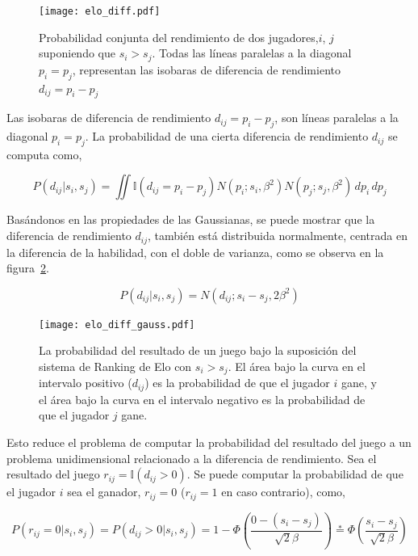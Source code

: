 \documentclass[11pt,twoside, spanish]{report} %
\begin{document}
\begin{figure}[H]
	\centering
	\texttt{[image: elo\_diff.pdf]}
	\caption{Probabilidad conjunta del rendimiento de dos jugadores,$i$, $j$ suponiendo que $s_i>s_j$. Todas las l\'ineas paralelas a la diagonal $p_i=p_j$, representan las isobaras de diferencia de  rendimiento $d_{ij}=p_i-p_j$ }
	\label{fig:fig6}
\end{figure}

Las isobaras de diferencia de rendimiento $d_{ij} = p_i-p_j$, son l\'ineas paralelas a la diagonal $p_i=p_j$.
La probabilidad de una cierta diferencia de rendimiento $d_{ij}$ se computa como,

\begin{equation}\label{eq:ProbDiff}
P(d_{ij}|s_i,s_j) = \iint \mathbb{I}(d_{ij}=p_i -p_j) N(p_i;s_i,\beta^2)N(p_j;s_j,\beta^2) \, dp_i \, dp_j
\end{equation}

Bas\'andonos en las propiedades de las Gaussianas, se puede mostrar que la diferencia de rendimiento $d_{ij}$, tambi\'en est\'a distribuida normalmente, centrada en la diferencia de la habilidad, con el doble de varianza, como se observa en la figura~\ref{fig:fig7}.

\begin{equation}\label{eq:ProbDiff2}
P(d_{ij}|s_i,s_j) = N(d_{ij};s_i-s_j,2\beta^2)
\end{equation}

\begin{figure}[H]
	\centering
	\texttt{[image: elo\_diff\_gauss.pdf]}
	\caption{La probabilidad del resultado de un juego bajo la suposici\'on del sistema de Ranking de Elo con $s_i>s_j$. El \'area bajo la curva en el intervalo positivo ($d_{ij}$) es la probabilidad de que el jugador $i$ gane, y el \'area bajo la curva en el intervalo negativo es la probabilidad de que el jugador $j$ gane.}
	\label{fig:fig7}
\end{figure}

Esto reduce el problema de computar la probabilidad del resultado del juego a un problema unidimensional relacionado a la diferencia de rendimiento.
Sea el resultado del juego $r_{ij} = \mathbb{I}(d_{ij}>0)$.
Se puede computar la probabilidad de que el jugador $i$ sea el ganador, $r_{ij} = 0$ ($r_{ij} = 1$ en caso contrario), como,

\begin{equation}
P(r_{ij}=0|s_i,s_j) = P(d_{ij} > 0 | s_i, s_j) = 1 - \Phi \left( \frac{0 - (s_i - s_j)}{\sqrt{2}\beta} \right) \overset{*}{=} \Phi \left(\frac{s_i - s_j}{\sqrt{2}\beta} \right)
\end{equation}
\end{document}
